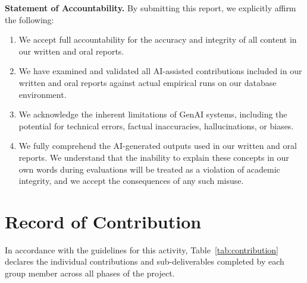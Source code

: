 \documentclass[sigconf, pbalance, nonacm]{acmart}
\begin{document}
\noindent\textbf{Statement of Accountability.} By submitting this report, we explicitly affirm the following:
\begin{enumerate}
    \item We accept full accountability for the accuracy and integrity of all content in our written and oral reports.
    \item We have examined and validated all AI-assisted contributions included in our written and oral reports against actual empirical runs on our database environment.
    \item We acknowledge the inherent limitations of GenAI systems, including the potential for technical errors, factual inaccuracies, hallucinations, or biases.
    \item We fully comprehend the AI-generated outputs used in our written and oral reports. We understand that the inability to explain these concepts in our own words during evaluations will be treated as a violation of academic integrity, and we accept the consequences of any such misuse.
\end{enumerate}

\section{Record of Contribution}
In accordance with the guidelines for this activity, Table~\ref{tab:contribution} declares the individual contributions and sub-deliverables completed by each group member across all phases of the project.
\end{document}
